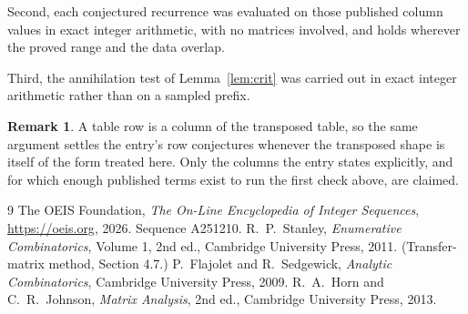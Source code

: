 \documentclass[11pt,a4paper]{article}
\theoremstyle{plain}
\theoremstyle{definition}
\newtheorem{remark}[theorem]{Remark}
\begin{document}
Second, each conjectured recurrence was evaluated on those published column values in exact
integer arithmetic, with no matrices involved, and holds wherever the proved range and the
data overlap.

Third, the annihilation test of Lemma~\ref{lem:crit} was carried out in exact integer
arithmetic rather than on a sampled prefix.

\begin{remark}
A table row is a column of the transposed table, so the same argument settles the entry's row
conjectures whenever the transposed shape is itself of the form treated here. Only the columns
the entry states explicitly, and for which enough published terms exist to run the first check
above, are claimed.
\end{remark}

\begin{thebibliography}{9}
 The OEIS Foundation, \emph{The On-Line Encyclopedia of Integer
Sequences}, \url{https://oeis.org}, 2026. Sequence A251210.
 R.~P.~Stanley, \emph{Enumerative Combinatorics}, Volume 1, 2nd ed.,
Cambridge University Press, 2011. (Transfer-matrix method, Section 4.7.)
 P.~Flajolet and R.~Sedgewick, \emph{Analytic Combinatorics}, Cambridge
University Press, 2009.
 R.~A.~Horn and C.~R.~Johnson, \emph{Matrix Analysis}, 2nd ed., Cambridge
University Press, 2013.
\end{thebibliography}
\end{document}
